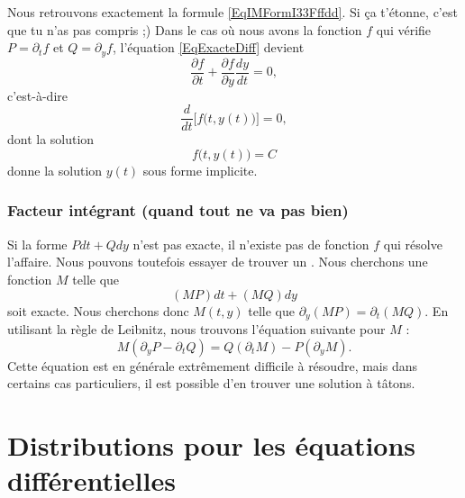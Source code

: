 Nous retrouvons exactement la formule \eqref{EqIMFormI33Fffdd}. Si ça t'étonne, c'est que tu n'as pas compris ;) Dans le cas où nous avons la fonction $f$ qui vérifie $P=\partial_tf$ et $Q=\partial_yf$, l'équation \eqref{EqExacteDiff} devient
\begin{equation}
	\frac{ \partial f }{ \partial t }+\frac{ \partial f }{ \partial y }\frac{ dy }{ dt }=0,
\end{equation}
c'est-à-dire
\begin{equation}
	\frac{ d }{ dt }\Big[ f\big( t,y(t) \big) \Big]=0,
\end{equation}
dont la solution
\begin{equation}
	f\big( t,y(t) \big)=C
\end{equation}
donne la solution $y(t)$ sous forme implicite.

\subsubsection{Facteur intégrant (quand tout ne va pas bien)}

Si la forme $Pdt+Qdy$ n'est pas exacte, il n'existe pas de fonction $f$ qui résolve l'affaire. Nous pouvons toutefois essayer de trouver un . Nous cherchons une fonction $M$ telle que
\begin{equation}
	(MP)dt+(MQ)dy
\end{equation}
soit exacte. Nous cherchons donc $M(t,y)$ telle que $\partial_y(MP)=\partial_t(MQ)$. En utilisant la règle de Leibnitz, nous trouvons l'équation suivante pour $M$ :
\begin{equation}		\label{EqDuFacteurIntegrant}
	M(\partial_yP-\partial_tQ)=Q(\partial_tM)-P(\partial_yM).
\end{equation}
Cette équation est en générale extrêmement difficile à résoudre, mais dans certains cas particuliers, il est possible d'en trouver une solution à tâtons.

\section{Distributions pour les équations différentielles}
\label{SecTNgeNms}

